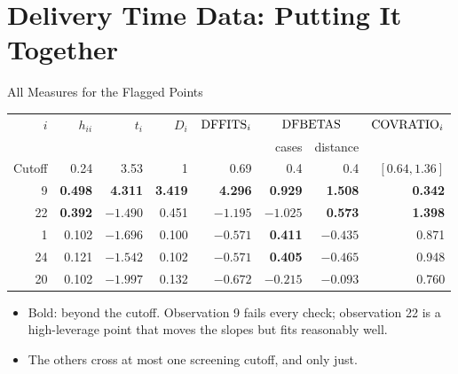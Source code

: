 \section{Delivery Time Data: Putting It Together}


\begin{frame}{All Measures for the Flagged Points}
    \begin{center}
        \footnotesize
        \setlength{\tabcolsep}{5pt}
        \begin{tabular}{rrrrrrrr}
            \toprule
            $i$ & $h_{ii}$ & $t_i$ & $D_i$ & $\mathrm{DFFITS}_i$ & \multicolumn{2}{c}{$\mathrm{DFBETAS}$} & $\mathrm{COVRATIO}_i$ \\
            & & & & & cases & distance & \\
            \midrule
            Cutoff & 0.24 & 3.53 & 1 & 0.69 & 0.4 & 0.4 & $[0.64,1.36]$ \\
            \midrule
            9 & \textbf{0.498} & \textbf{4.311} & \textbf{3.419} & \textbf{4.296} & \textbf{0.929} & \textbf{1.508} & \textbf{0.342} \\
            22 & \textbf{0.392} & $-1.490$ & 0.451 & $\mathbf{-1.195}$ & $\mathbf{-1.025}$ & \textbf{0.573} & \textbf{1.398} \\
            1 & 0.102 & $-1.696$ & 0.100 & $-0.571$ & \textbf{0.411} & $\mathbf{-0.435}$ & 0.871 \\
            24 & 0.121 & $-1.542$ & 0.102 & $-0.571$ & \textbf{0.405} & $\mathbf{-0.465}$ & 0.948 \\
            20 & 0.102 & $-1.997$ & 0.132 & $-0.672$ & $-0.215$ & $-0.093$ & 0.760 \\
            \bottomrule
        \end{tabular}
    \end{center}
    \begin{itemize}
        \item Bold: beyond the cutoff. Observation 9 fails every check; observation 22 is a high-leverage point that moves the slopes but fits reasonably well.
        \item The others cross at most one screening cutoff, and only just.
    \end{itemize}
\end{frame}


